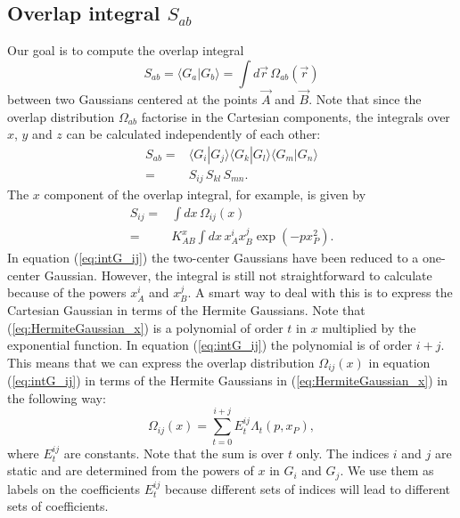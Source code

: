 \subsection{Overlap integral $S_{ab}$}
Our goal is to compute the overlap integral
\begin{equation}
S_{ab}  = \langle G_a|G_b\rangle = \int d\vec r \,\Omega_{ab}(\vec r)
\end{equation}
between two Gaussians centered at the points $\vec A$ and $\vec B$.
Note that since the overlap distribution $\Omega_{ab}$ factorise in the Cartesian components, the integrals over $x$, $y$ and $z$ can be calculated independently of each other:
\begin{equation}
\begin{split}
 S_{ab} = & \langle G_i|G_j\rangle \langle G_k|G_l\rangle \langle G_m|G_n\rangle \\
        = & S_{ij}\,S_{kl}\,S_{mn}.
\end{split}
\end{equation}
The $x$ component of the overlap integral, for example, is given by
\begin{equation}
\label{eq:intG_ij}
\begin{split}
 S_{ij} = & \int dx \,\Omega_{ij}(x) \\
        = & K_{AB}^x\int dx \,x_A^ix_B^j\exp(-px_P^2).
\end{split}
\end{equation}
In equation (\ref{eq:intG_ij}) the two-center Gaussians have been reduced to a one-center Gaussian.
However, the integral is still not straightforward to calculate because of the powers $x_A^i$ and $x_B^j$. A smart way to deal with this is to express the Cartesian Gaussian
in terms of the Hermite Gaussians. Note that (\ref{eq:HermiteGaussian_x}) is a polynomial of order $t$ in $x$ multiplied by the exponential function. In equation (\ref{eq:intG_ij}) the polynomial
is of order $i+j$. This means that we can express the overlap distribution $\Omega_{ij}(x)$ in equation (\ref{eq:intG_ij}) in terms of the Hermite Gaussians in (\ref{eq:HermiteGaussian_x}) in the following way:
\begin{equation}
\label{eq:LinCombOfHermGauss}
 \Omega_{ij}(x) = \sum_{t=0}^{i+j} E^{ij}_t \Lambda_t(p, x_P),
\end{equation}
where $E^{ij}_t$ are constants.
Note that the sum is over $t$ only. The indices $i$ and $j$ are static and are determined from the powers of $x$ in $G_i$ and $G_j$.
We use them as labels on the coefficients $E^{ij}_t$ because different sets of indices will lead to different sets of coefficients.

